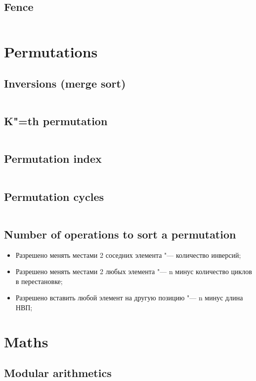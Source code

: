 ﻿\documentclass[10pt,twocolumn,oneside]{article}
\begin{document}
\subsection{Fence}
\inputminted[breaklines]{cpp}{DP/fence.cpp}

\section{Permutations}
\subsection{Inversions (merge sort)}
\inputminted[breaklines]{cpp}{Permutations/inversions.cpp}
\subsection{K"=th permutation}
\inputminted[breaklines]{cpp}{Permutations/k-th permutation.cpp}
\subsection{Permutation index}
\inputminted[breaklines]{python}{Permutations/permutation number.py}
\subsection{Permutation cycles}
\inputminted[breaklines]{cpp}{Permutations/permutation cycles.cpp}
\subsection{Number of operations to sort a permutation}
\begin{itemize}
\item Разрешено менять местами 2 соседних элемента "--- количество инверсий;
\item Разрешено менять местами 2 любых элемента "--- n минус количество циклов в перестановке;
\item Разрешено вставить любой элемент на другую позицию "--- n минус длина НВП;
\end{itemize}

\section{Maths}
\subsection{Modular arithmetics}
\inputminted[breaklines]{cpp}{Maths/modular arithmetics.cpp}
\end{document}
